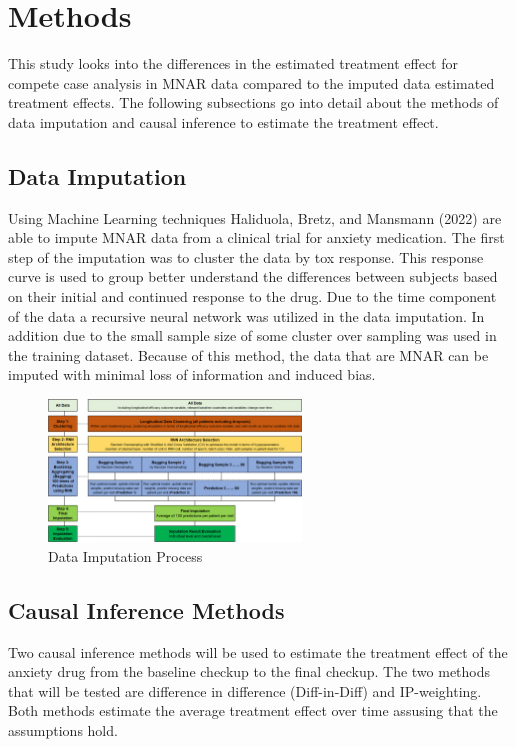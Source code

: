 \documentclass[
]{article}
\begin{document}
\section{Methods}\label{methods}

This study looks into the differences in the estimated treatment effect
for compete case analysis in MNAR data compared to the imputed data
estimated treatment effects. The following subsections go into detail
about the methods of data imputation and causal inference to estimate
the treatment effect.

\subsection{Data Imputation}\label{data-imputation}

Using Machine Learning techniques Haliduola, Bretz, and Mansmann (2022)
are able to impute MNAR data from a clinical trial for anxiety
medication. The first step of the imputation was to cluster the data by
tox response. This response curve is used to group better understand the
differences between subjects based on their initial and continued
response to the drug. Due to the time component of the data a recursive
neural network was utilized in the data imputation. In addition due to
the small sample size of some cluster over sampling was used in the
training dataset. Because of this method, the data that are MNAR can be
imputed with minimal loss of information and induced bias.

\begin{figure}
\centering
\includegraphics[width=0.6\textwidth,height=\textheight]{bimj2344-fig-0002-m.jpg}
\caption{Data Imputation Process}
\end{figure}

\subsection{Causal Inference Methods}\label{causal-inference-methods}

Two causal inference methods will be used to estimate the treatment
effect of the anxiety drug from the baseline checkup to the final
checkup. The two methods that will be tested are difference in
difference (Diff-in-Diff) and IP-weighting. Both methods estimate the
average treatment effect over time assusing that the assumptions hold.
\end{document}
